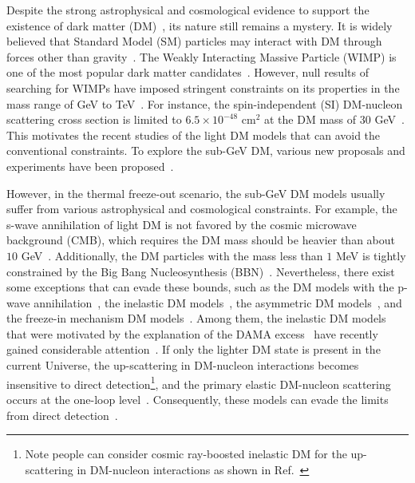 \documentclass[preprint, superscriptaddress,amsmath, nofootinbib]{revtex4-1}
\begin{document}
{Despite the strong astrophysical and cosmological evidence to support the existence of dark matter (DM)~\cite{Trimble:1987ee,Barack:2018yly}, its nature still remains a mystery. It is widely believed that Standard Model (SM) particles may interact with DM through forces other than gravity~\cite{Pospelov:2007mp}. The Weakly Interacting Massive Particle (WIMP) is one of the most popular dark matter candidates~\cite{Feng:2010gw,Bauer:2017qwy}. However, null results of searching for WIMPs have imposed stringent constraints on its properties in the mass range of GeV to TeV~\cite{Schumann:2019eaa,Kahlhoefer:2017dnp}. For instance, the spin-independent (SI) DM-nucleon scattering cross section is limited to $6.5\times10^{-48}$ $\text{cm}^2$ at the DM mass of $30$ GeV~\cite{LZ:2022ufs,XENON:2023sxq}. 
This motivates the recent studies of the light DM models that can avoid the conventional constraints. To explore the sub-GeV DM, various new proposals and experiments have been proposed~\cite{Knapen:2017xzo,Lin:2022hnt}.
}


However, in the thermal freeze-out scenario, the sub-GeV DM models usually suffer from various astrophysical and cosmological constraints. For example, the s-wave annihilation of light DM is not favored by the cosmic microwave background (CMB), which requires the DM mass should be heavier than about $10$ GeV~\cite{Lin:2011gj}. Additionally, the DM particles with the mass less than $1$ MeV is tightly constrained by the Big Bang Nucleosynthesis (BBN)~\cite{Nollett:2014lwa}. Nevertheless, there exist some exceptions that can evade these bounds, such as the DM models with the p-wave annihilation~\cite{Matsumoto:2018acr}, the inelastic DM models~\cite{Tucker-Smith:2001myb}, the asymmetric DM models~\cite{Zurek:2013wia}, and the freeze-in mechanism DM models~\cite{Dvorkin:2020xga}. Among them, the inelastic DM models that were motivated by the explanation of the DAMA excess~\cite{Tucker-Smith:2001myb} have recently gained considerable attention~\cite{Baek:2014kna,Izaguirre:2015zva,DEramo:2016gqz,Izaguirre:2017bqb,Berlin:2018jbm,Mohlabeng:2019vrz,Tsai:2019buq,Okada:2019sbb,Ko:2019wxq,Duerr:2019dmv,Duerr:2020muu,Ema:2020fit,Kang:2021oes,Bell:2021zkr,Batell:2021ooj,Bell:2021xff,Feng:2021hyz,Guo:2021vpb,Li:2021rzt,Filimonova:2022pkj,Bertuzzo:2022ozu,Gu:2022vgb,Li:2022acp,Mongillo:2023hbs,Heeba:2023bik}. If only the lighter DM state is present in the current Universe, the up-scattering in DM-nucleon interactions becomes insensitive to direct detection\footnote{Note people can consider cosmic ray-boosted inelastic DM for the up-scattering in DM-nucleon interactions as shown in Ref.~\cite{Bell:2021xff,Feng:2021hyz}}, and the primary elastic DM-nucleon scattering occurs at the one-loop level~\cite{Izaguirre:2015zva}. Consequently, these models can evade the limits from direct detection~\cite{CarrilloGonzalez:2021lxm}. 
\end{document}
